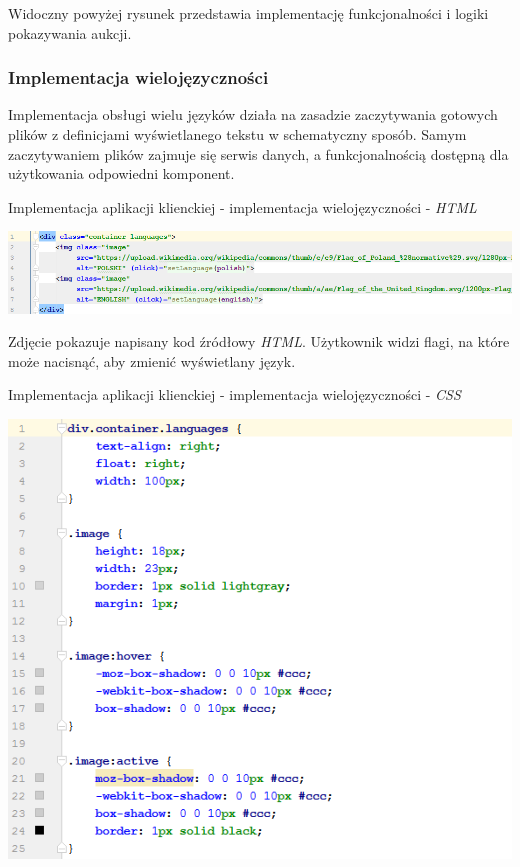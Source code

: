 \documentclass[10pt,titlepage]{article} %
\begin{document}
Widoczny powyżej rysunek przedstawia implementację funkcjonalności i logiki pokazywania aukcji.


\subsubsection{Implementacja wielojęzyczności}
Implementacja obsługi wielu języków działa na zasadzie zaczytywania gotowych plików z definicjami wyświetlanego tekstu w schematyczny sposób. Samym zaczytywaniem plików zajmuje się serwis danych, a funkcjonalnością dostępną dla użytkowania odpowiedni komponent.

\begin{listing}[H]
\caption[Implementacja aplikacji klienckiej - implementacja wielojęzyczności - \textit{HTML}]{Implementacja aplikacji klienckiej - implementacja wielojęzyczności - \textit{HTML}}
\includegraphics[width=1.0\textwidth, height=0.17\textheight]{img/sekcja3/frontend/wielojezycznoscHtml}
\end{listing}
Zdjęcie pokazuje napisany kod źródłowy \textit{HTML}. Użytkownik widzi flagi, na które może nacisnąć, aby zmienić wyświetlany język.

\begin{listing}[H]
\caption[Implementacja aplikacji klienckiej - implementacja wielojęzyczności - \textit{CSS}]{Implementacja aplikacji klienckiej - implementacja wielojęzyczności - \textit{CSS}}
\includegraphics[width=\textwidth]{img/sekcja3/frontend/wielojezycznoscCss}
\end{listing}
\end{document}
